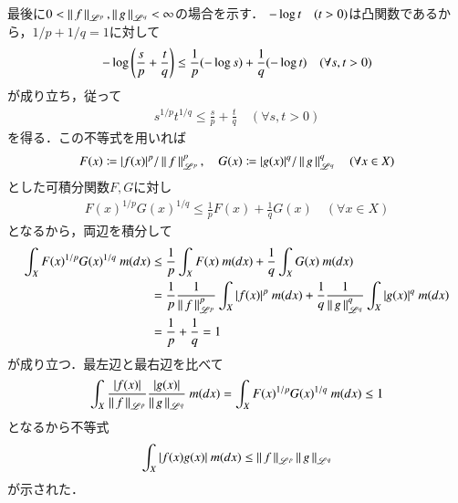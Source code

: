 \begin{prf}
\begin{description}
			最後に$0 < \left\|\, f\, \right\|_{\mathscr{L}^p},\left\|\, g\, \right\|_{\mathscr{L}^q} < \infty$の場合を示す．
			$-\operatorname{log} t \quad (t > 0)$は凸関数であるから，$1/p + 1/q = 1$に対して
			\begin{align}
				-\operatorname{log} \left( \frac{s}{p} + \frac{t}{q} \right) \leq \frac{1}{p}(-\operatorname{log} s) + \frac{1}{q}(-\operatorname{log} t) \quad (\forall s,t > 0)
			\end{align}
			が成り立ち，従って
			\begin{align}
				s^{1/p}t^{1/q} \leq \frac{s}{p} + \frac{t}{q} \quad (\forall s,t > 0)
			\end{align}
			を得る．この不等式を用いれば
			\begin{align}
				F(x) \coloneqq |f(x)|^p/ \left\|\, f\, \right\|_{\mathscr{L}^p}^p,\quad G(x) \coloneqq |g(x)|^q/ \left\|\, g\, \right\|_{\mathscr{L}^q}^q \quad (\forall x \in X)
			\end{align}
			とした可積分関数$F,G$に対し
			\begin{align}
				F(x)^{1/p}G(x)^{1/q} \leq \frac{1}{p}F(x) + \frac{1}{q}G(x) \quad (\forall x \in X)
			\end{align}
			となるから，両辺を積分して
			\begin{align}
				\int_{X} F(x)^{1/p}G(x)^{1/q}\ m(dx) &\leq \frac{1}{p} \int_{X} F(x)\ m(dx) + \frac{1}{q} \int_{X} G(x)\ m(dx) \\
				&= \frac{1}{p} \frac{1}{\left\|\, f\, \right\|_{\mathscr{L}^p}^p} \int_{X} |f(x)|^p\ m(dx) + \frac{1}{q} \frac{1}{\left\|\, g\, \right\|_{\mathscr{L}^q}^q} \int_{X} |g(x)|^q\ m(dx) \\
				&= \frac{1}{p} + \frac{1}{q} = 1
			\end{align}
			が成り立つ．最左辺と最右辺を比べて
			\begin{align}
				\int_{X} \frac{|f(x)|}{\left\|\, f\, \right\|_{\mathscr{L}^p}} \frac{|g(x)|}{\left\|\, g\, \right\|_{\mathscr{L}^q}}\ m(dx) = \int_{X} F(x)^{1/p}G(x)^{1/q}\ m(dx) \leq 1
			\end{align}
			となるから不等式
			\begin{align}
				\int_{X} |f(x)g(x)|\ m(dx) \leq \left\|\, f\, \right\|_{\mathscr{L}^p}\left\|\, g\, \right\|_{\mathscr{L}^q}
			\end{align}
			が示された．
			\QED
	\end{description}
\end{prf}

